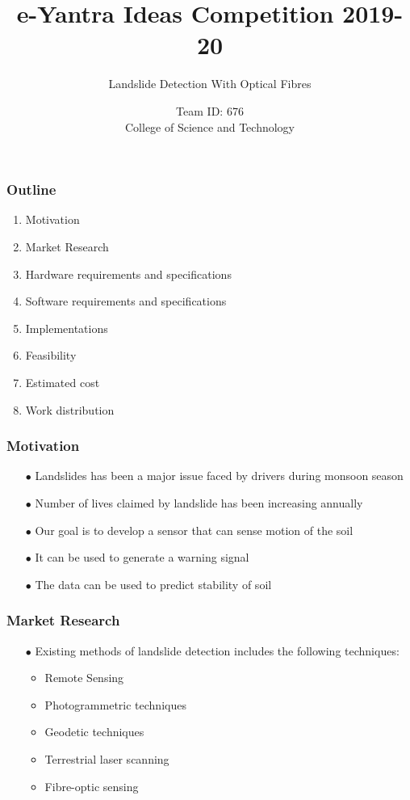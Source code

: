 \documentclass{beamer}
\begin{document}
	\title{e-Yantra Ideas Competition 2019-20}
	\subtitle{Landslide Detection With Optical Fibres}
	\author{Team ID: 676\\College of Science and Technology}
	\begin{frame}
		\titlepage
	\end{frame}
\begin{frame}
	\frametitle{Outline}
	\begin{enumerate}
		\item Motivation
		\item Market Research
		\item Hardware requirements and specifications
		\item Software requirements and specifications
		\item Implementations
		\item Feasibility
		\item Estimated cost
		\item Work distribution
	\end{enumerate}
\end{frame}
\begin{frame}
	\frametitle{Motivation}
	\begin{itemize}
		\item[$\bullet$] Landslides has been a major issue faced by drivers during monsoon season
		\item[$\bullet$] Number of lives claimed by landslide has been increasing annually
		\item[$\bullet$] Our goal is to develop a sensor that can sense motion of the soil
		\item[$\bullet$] It can be used to generate a warning signal
		\item[$\bullet$] The data can be used to predict stability of soil
	\end{itemize}
\end{frame}
\begin{frame}
	\frametitle{Market Research}
	\begin{itemize}
		\item[$\bullet$] Existing methods of landslide detection includes the following techniques:
		\begin{itemize}
			\item Remote Sensing
			\item Photogrammetric techniques
			\item Geodetic techniques
			\item Terrestrial laser scanning
			\item Fibre-optic sensing
		\end{itemize}  
	\end{itemize}
\end{frame}
\end{document}
